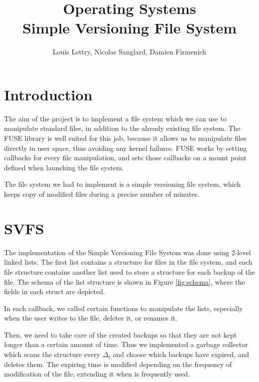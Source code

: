\documentclass[a4paper]{article}
\title{Operating Systems\\Simple Versioning File System}
\author{Louis Lettry, Nicolas Sanglard, Damien Firmenich}
\date{}
\begin{document}
\maketitle

\section{Introduction}
The aim of the project is to implement a file system which we can use to manipulate standard files, in addition to the already existing file system. The FUSE library is well suited for this job, because it allows us to manipulate files directly in user space, thus avoiding any kernel failures. FUSE works by setting callbacks for every file manipulation, and sets those callbacks on a mount point defined when launching the file system.

The file system we had to implement is a simple versioning file system, which keeps copy of modified files during a precise number of minutes.

\section{SVFS}
The implementation of the Simple Versioning File System was done using 2-level linked lists. The first list contains a structure for files in the file system, and each file structure contains another list used to store a structure for each backup of the file. The schema of the list structure is shown in Figure \ref{fig:schema}, where the fields in each struct are depicted.

In each callback, we called certain functions to manipulate the lists, especially when the user writes to the file, deletes it, or renames it.

Then, we need to take care of the created backups so that they are not kept longer than a certain amount of time. Thus we implemented a garbage collector which scans the structure every $\Delta_t$ and choose which backups have expired, and deletes them. The expiring time is modified depending on the frequency of modification of the file, extending it when is frequently used.
\end{document}
